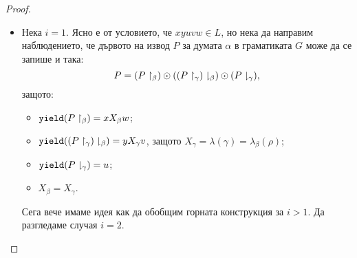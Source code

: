 \begin{proof}
\begin{enumerate}[1)]
\begin{itemize}
\begin{figure}[H]
\begin{subfigure}[t]{0.3\textwidth}
          \caption{\scriptsize{$(\uppercut{P}{\beta}) \odot (\lowercut{P}{\gamma})$ е дърво на извод за думата $xuw$}}
        \end{subfigure}
      \end{figure}
    \item
      Нека $i = 1$.
      Ясно е от условието, че $xyuvw \in L$, но нека да направим наблюдението, че дървото на извод $P$ за думата $\alpha$ в граматиката $G$
      може да се запише и така:
      \[P = ({P}\upharpoonright_{\beta}) \odot ({({P}\upharpoonright_{\gamma})}\downharpoonright_{\beta}) \odot ({P}\downharpoonright_{\gamma}), \]
      защото:
      \begin{itemize}
      \item
        $\texttt{yield}({P}\upharpoonright_{\beta}) = x X_\beta w$;
      \item
        $\texttt{yield}({({P}\upharpoonright_{\gamma})}\downharpoonright_{\beta}) = y X_\gamma v$, защото $X_\gamma = \lambda(\gamma) = \lambda_\beta(\rho)$;
      \item
        $\texttt{yield}({P}\downharpoonright_{\gamma}) = u$;
      \item
        $X_\beta = X_\gamma$.
      \end{itemize}

      Сега вече имаме идея как да обобщим горната конструкция за $i > 1$.
      Да разгледаме случая $i = 2$.
      \begin{figure}[H]
        \begin{subfigure}[t]{0.3\textwidth}
          \centering
\end{subfigure}
\end{figure}
\end{itemize}
\end{enumerate}
\end{proof}
